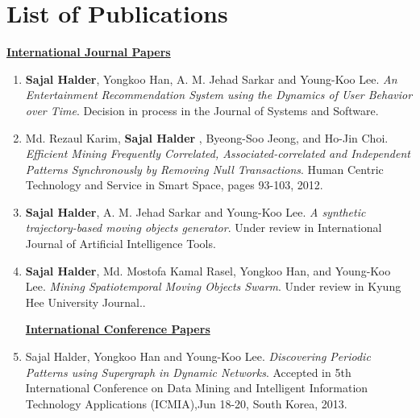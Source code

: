 \renewcommand{\headrulewidth}{0.5pt}
%
\chapter{List of Publications}
\begin{center}
\textbf{\Large \underline {International Journal Papers}} \\
\end{center}
\begin{enumerate}
%

\item  \textbf{Sajal Halder}, Yongkoo Han, A. M. Jehad Sarkar and Young-Koo Lee. \textit{An Entertainment Recommendation System using the Dynamics of User Behavior over Time}. Decision in process in the Journal of Systems and Software.

\item	Md. Rezaul Karim, \textbf{Sajal Halder} , Byeong-Soo Jeong, and Ho-Jin Choi. \textit{Efficient Mining Frequently Correlated, Associated-correlated and Independent Patterns Synchronously by Removing Null Transactions}. Human Centric Technology and Service in Smart Space, pages 93-103, 2012. 

\item \textbf{Sajal Halder}, A. M. Jehad Sarkar and Young-Koo Lee. \textit{A synthetic trajectory-based moving objects generator}. Under review  in International Journal of Artificial Intelligence Tools.

\item \textbf{Sajal Halder}, Md. Mostofa Kamal Rasel, Yongkoo Han, and Young-Koo Lee. \textit{Mining Spatiotemporal Moving Objects Swarm}. Under review in Kyung Hee University Journal..

\pagebreak


%
\begin{center}
\textbf{\Large \underline{International Conference Papers}} 
\end{center}

\item Sajal Halder, Yongkoo Han and Young-Koo Lee. \textit{Discovering Periodic Patterns using Supergraph in Dynamic Networks}. Accepted in 5th International Conference on Data Mining and Intelligent Information Technology Applications (ICMIA),Jun 18-20, South Korea, 2013.


\end{enumerate}
